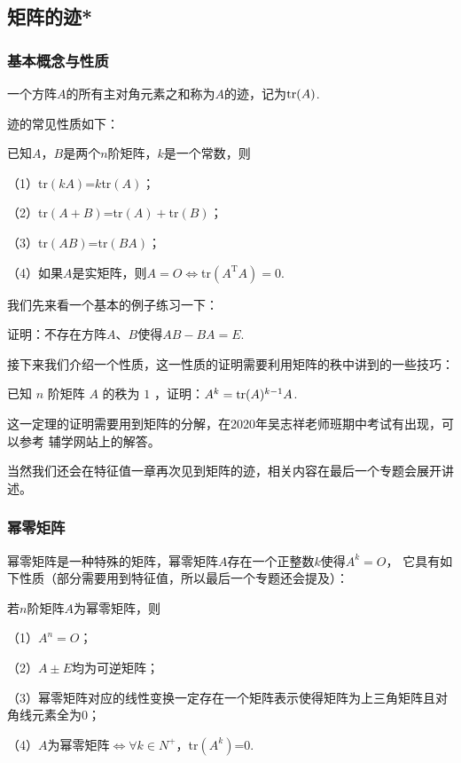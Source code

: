 \subsection{矩阵的迹*}
\subsubsection{基本概念与性质}
\begin{definition}
	一个方阵$A$的所有主对角元素之和称为$A$的迹，记为$\textup{tr}(A)$.
\end{definition}
迹的常见性质如下：
\begin{theorem}
	已知$A$，$B$是两个$n$阶矩阵，$k$是一个常数，则

	\textup{（1）}\textup{tr}$(kA)$=$k$\textup{tr}$(A)$；

	\textup{（2）}\textup{tr}$(A+B)$=\textup{tr}$(A)+$\textup{tr}$(B)$；
	
	\textup{（3）}\textup{tr}$(AB)$=\textup{tr}$(BA)$；
	
	\textup{（4）}如果$A$是实矩阵，则$A=O \iff$\textup{tr}$(A^{\mathrm{T}}A)=0$.
\end{theorem}

我们先来看一个基本的例子练习一下：
\begin{example}
	证明：不存在方阵$A$、$B$使得$AB-BA=E$.
\end{example}

接下来我们介绍一个性质，这一性质的证明需要利用矩阵的秩中讲到的一些技巧：
\begin{theorem}
	已知 $n$ 阶矩阵 $A$ 的秩为 $1$ ，证明：$A^k=\textup{tr}(A)^{k-1}A$.
\end{theorem}
这一定理的证明需要用到矩阵的分解，在2020年吴志祥老师班期中考试有出现，可以参考
辅学网站上的解答。

当然我们还会在特征值一章再次见到矩阵的迹，相关内容在最后一个专题会展开讲述。

\subsubsection{幂零矩阵}
幂零矩阵是一种特殊的矩阵，幂零矩阵$A$存在一个正整数$k$使得$A^k=O$，
它具有如下性质（部分需要用到特征值，所以最后一个专题还会提及）：
\begin{theorem}
	若$n$阶矩阵$A$为幂零矩阵，则

	\textup{（1）}$A^n=O$；

	\textup{（2）}$A\pm E$均为可逆矩阵；

	\textup{（3）}幂零矩阵对应的线性变换一定存在一个矩阵表示使得矩阵为上三角矩阵且对角线元素全为\textup{0}；
	
	\textup{（4）}$A$为幂零矩阵$\iff \forall k \in N^+$，\textup{tr}$(A^k)$=\textup{0}.
\end{theorem}

